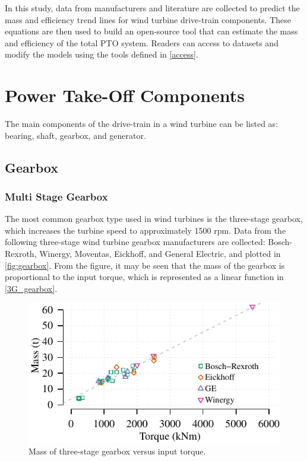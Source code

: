 \documentclass{article}\usepackage{graphicx, color}
\makeatletter
\def\maxwidth{ %
  \ifdim\Gin@nat@width>\linewidth
    \linewidth
  \else
    \Gin@nat@width
  \fi
}
\newenvironment{knitrout}{}{} %
\makeatother
\begin{document}
\vspace{6pt}

In this study, data from manufacturers and literature are collected to predict the  mass and efficiency trend lines for wind turbine drive-train components. These equations are then used to build an open-source tool that can estimate the mass and efficiency of the total PTO system. Readers can access to datasets and modify the models using the tools defined in \autoref{access}.

\section{Power Take-Off Components}

The main components of the drive-train in a wind turbine can be listed as: bearing, shaft, gearbox, and generator. 

\subsection{Gearbox}

\subsubsection{Multi Stage Gearbox}

The most common gearbox type used in wind turbines is the three-stage gearbox, which increases the turbine speed to approximately 1500 rpm. 
Data from the following three-stage wind turbine gearbox manufacturers are collected: Bosch-Rexroth\cite{bosch}, Winergy\cite{winergy}, Moventas\cite{Moventas}, Eickhoff\cite{eickhoff}, and General Electric\cite{GE}, and plotted in \autoref{fig:gearbox}. From the figure, it may be seen that the mass of the gearbox is proportional to the input torque, which is represented as a linear function in \autoref{3G_gearbox}. 

\begin{knitrout}
\color{fgcolor}\begin{figure}[]


{\centering \includegraphics[width=\maxwidth]{figure/gearbox} 

}

\caption[Mass of three-stage gearbox versus input torque]{Mass of three-stage gearbox versus input torque.\label{fig:gearbox}}
\end{figure}


\end{knitrout}
\end{document}
